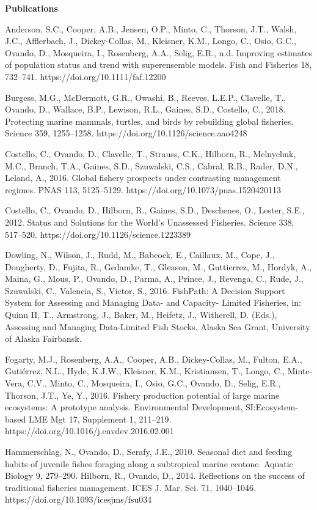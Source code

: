 \documentclass[twoside,12pt,final]{ucthesis-CA2012}
\begin{document}
\begin{ucfrontmatter}
\begin{vitae}
    \textbf{Publications}

    Anderson, S.C., Cooper, A.B., Jensen, O.P., Minto, C., Thorson, J.T., Walsh, J.C., Afflerbach, J., Dickey‐Collas, M., Kleisner, K.M., Longo, C., Osio, G.C., Ovando, D., Mosqueira, I., Rosenberg, A.A., Selig, E.R., n.d. Improving estimates of population status and trend with superensemble models. Fish and Fisheries 18, 732–741. https://doi.org/10.1111/faf.12200

 Burgess, M.G., McDermott, G.R., Owashi, B., Reeves, L.E.P., Clavelle, T., Ovando, D., Wallace, B.P., Lewison, R.L., Gaines, S.D., Costello, C., 2018. Protecting marine mammals, turtles, and birds by rebuilding global fisheries. Science 359, 1255–1258. https://doi.org/10.1126/science.aao4248

Costello, C., Ovando, D., Clavelle, T., Strauss, C.K., Hilborn, R., Melnychuk, M.C., Branch, T.A., Gaines, S.D., Szuwalski, C.S., Cabral, R.B., Rader, D.N., Leland, A., 2016. Global fishery prospects under contrasting management regimes. PNAS 113, 5125–5129. https://doi.org/10.1073/pnas.1520420113

Costello, C., Ovando, D., Hilborn, R., Gaines, S.D., Deschenes, O., Lester, S.E., 2012. Status and Solutions for the World’s Unassessed Fisheries. Science 338, 517–520. https://doi.org/10.1126/science.1223389

Dowling, N., Wilson, J., Rudd, M., Babcock, E., Caillaux, M., Cope, J., Dougherty, D., Fujita, R., Gedamke, T., Gleason, M., Guttierrez, M., Hordyk, A., Maina, G., Mous, P., Ovando, D., Parma, A., Prince, J., Revenga, C., Rude, J., Szuwalski, C., Valencia, S., Victor, S., 2016. FishPath: A Decision Support System for Assessing and Managing Data- and Capacity- Limited Fisheries, in: Quinn II, T., Armstrong, J., Baker, M., Heifetz, J., Witherell, D. (Eds.), Assessing and Managing Data-Limited Fish Stocks. Alaska Sea Grant, University of Alaska Fairbansk.

Fogarty, M.J., Rosenberg, A.A., Cooper, A.B., Dickey-Collas, M., Fulton, E.A., Gutiérrez, N.L., Hyde, K.J.W., Kleisner, K.M., Kristiansen, T., Longo, C., Minte-Vera, C.V., Minto, C., Mosqueira, I., Osio, G.C., Ovando, D., Selig, E.R., Thorson, J.T., Ye, Y., 2016. Fishery production potential of large marine ecosystems: A prototype analysis. Environmental Development, SI:Ecosystem-based LME Mgt 17, Supplement 1, 211–219. https://doi.org/10.1016/j.envdev.2016.02.001

Hammerschlag, N., Ovando, D., Serafy, J.E., 2010. Seasonal diet and feeding habits of juvenile fishes foraging along a subtropical marine ecotone. Aquatic Biology 9, 279–290.
Hilborn, R., Ovando, D., 2014. Reflections on the success of traditional fisheries management. ICES J. Mar. Sci. 71, 1040–1046. https://doi.org/10.1093/icesjms/fsu034


\end{vitae}
\end{ucfrontmatter}
\end{document}
